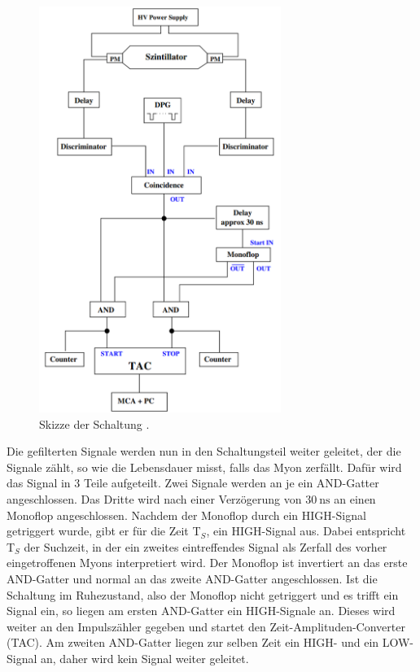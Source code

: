 \begin{figure}
    \centering
    \includegraphics[width= 0.7\textwidth]{plots/V01_Aufbau.png}
    \caption{Skizze der Schaltung \cite{V01}.}
    \label{fig:1}
\end{figure}
Die gefilterten Signale werden nun in den Schaltungsteil weiter geleitet, der die Signale zählt, so wie die Lebensdauer misst, falls das Myon zerfällt.
Dafür wird das Signal in 3 Teile aufgeteilt.
Zwei Signale werden an je ein AND-Gatter angeschlossen. 
Das Dritte wird nach einer Verzögerung von $\SI{30}{\nano\second}$ an einen Monoflop angeschlossen.
Nachdem der Monoflop durch ein HIGH-Signal getriggert wurde, gibt er für die Zeit T$_S$, ein HIGH-Signal aus.
Dabei entspricht T$_S$ der Suchzeit, in der ein zweites eintreffendes Signal als Zerfall des vorher eingetroffenen Myons interpretiert wird.
Der Monoflop ist invertiert an das erste AND-Gatter und normal an das zweite AND-Gatter angeschlossen.
Ist die Schaltung im Ruhezustand, also der Monoflop nicht getriggert und es trifft ein Signal ein, so liegen am ersten AND-Gatter ein HIGH-Signale an.
Dieses wird weiter an den Impulszähler gegeben und startet den Zeit-Amplituden-Converter (TAC).
Am zweiten AND-Gatter liegen zur selben Zeit ein HIGH- und ein LOW-Signal an, daher wird kein Signal weiter geleitet.


